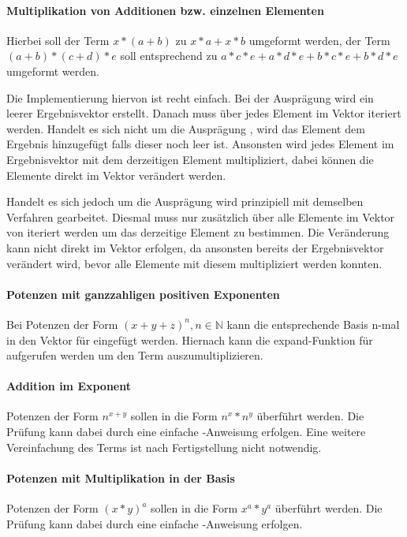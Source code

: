 \documentclass[11pt,a4paper, ngerman]{article}
\begin{document}
\paragraph{Multiplikation von Additionen bzw. einzelnen Elementen} Hierbei soll der Term $x*(a+b)$ zu $x*a+x*b$ umgeformt werden, der Term $(a+b)*(c+d)*e$ soll entsprechend zu $a*c*e + a*d*e + b*c*e + b*d*e$ umgeformt werden.

Die Implementierung hiervon ist recht einfach. Bei der Ausprägung  wird ein leerer Ergebnisvektor erstellt. Danach muss über jedes Element im Vektor iteriert werden. Handelt es sich nicht um die Ausprägung , wird das Element dem Ergebnis hinzugefügt falls dieser noch leer ist. Ansonsten wird jedes Element im Ergebnisvektor mit dem derzeitigen Element multipliziert, dabei können die Elemente direkt im Vektor verändert werden.

Handelt es sich jedoch um die Ausprägung  wird prinzipiell mit demselben Verfahren gearbeitet. Diesmal muss nur zusätzlich über alle Elemente im Vektor von  iteriert werden um das derzeitige Element zu bestimmen. Die Veränderung kann nicht direkt im Vektor erfolgen, da ansonsten bereits der Ergebnisvektor verändert wird, bevor alle Elemente mit diesem multipliziert werden konnten.

\paragraph{Potenzen mit ganzzahligen positiven Exponenten} Bei Potenzen der Form $(x+y+z)^n, n \in \mathbb{N}$ kann die entsprechende Basis n-mal in den Vektor für  eingefügt werden. Hiernach kann die expand-Funktion für  aufgerufen werden um den Term auszumultiplizieren. 

\paragraph{Addition im Exponent} Potenzen der Form $n^{x+y}$ sollen in die Form $n^x*n^y$ überführt werden. Die Prüfung kann dabei durch eine einfache -Anweisung erfolgen. Eine weitere Vereinfachung des Terms ist nach Fertigstellung nicht notwendig.

\paragraph{Potenzen mit Multiplikation in der Basis} Potenzen der Form $(x*y)^a$ sollen in die Form $x^a*y^a$ überführt werden. Die Prüfung kann dabei durch eine einfache -Anweisung erfolgen.
\end{document}
